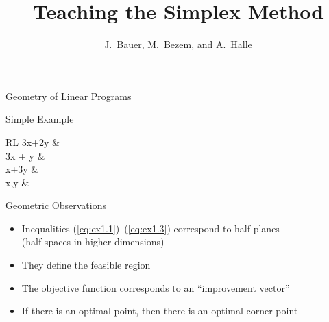 \documentclass[mathserif]{beamer}
\begin{document}
\title{Teaching the Simplex Method}
\author{J.~Bauer, M.~Bezem, and A.~Halle} 

\begin{frame}
\titlepage
\end{frame}

\begin{frame}
{Geometry of Linear Programs}
  \begin{block}{Simple Example}
	 \nointerlineskip
	 \begin{IEEEeqnarray}{RL}
		\max 3x+2y & \nonumber \\
		 3x + y &   \label{eq:ex1.1}\\
							x+3y &  \label{eq:ex1.2}\\
							x,y  &  \label{eq:ex1.3}
	 \end{IEEEeqnarray}
  \end{block}
	 \nointerlineskip
  \begin{block}{Geometric Observations}
	 \begin{itemize}[<+->]
		\item Inequalities (\ref{eq:ex1.1})--(\ref{eq:ex1.3}) correspond to half-planes\\ (half-spaces in higher dimensions)
		\item They define the feasible region
		\item The objective function corresponds to an ``improvement vector''
		\item If there is an optimal point, then there is an optimal corner point
	 \end{itemize}
  \end{block}
\end{frame}
\end{document}
